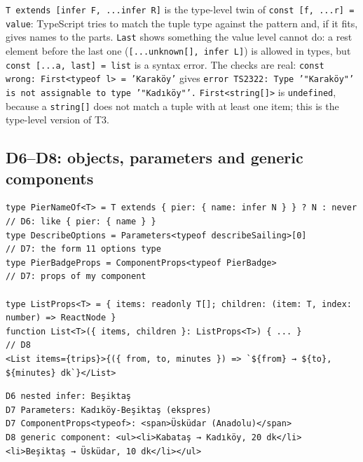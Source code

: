 \documentclass[
  10pt,
]{article}
\begin{document}
\texttt{T extends [\allowbreak{}infer F,\allowbreak{} .\allowbreak{}.\allowbreak{}.\allowbreak{}infer R]}
is the type-level twin of
\texttt{const [\allowbreak{}f,\allowbreak{} .\allowbreak{}.\allowbreak{}.\allowbreak{}r] =\allowbreak{} value}:
TypeScript tries to match the tuple type against the pattern and, if it
fits, gives names to the parts. \texttt{Last} shows something the value
level cannot do: a rest element before the last one
(\texttt{[\allowbreak{}.\allowbreak{}.\allowbreak{}.\allowbreak{}unknown[\allowbreak{}],\allowbreak{} infer L]})
is allowed in types, but
\texttt{const [\allowbreak{}.\allowbreak{}.\allowbreak{}.\allowbreak{}a,\allowbreak{} last] =\allowbreak{} list}
is a syntax error. The checks are real:
\texttt{const wrong:\allowbreak{} First<typeof l> =\allowbreak{} 'Karaköy'}
gives
\texttt{error TS2322:\allowbreak{} Type '"Karaköy"' is not assignable to type '"Kadıköy"'.\allowbreak{}}
\texttt{First<string[\allowbreak{}]>} is \texttt{undefined}, because a
\texttt{string[\allowbreak{}]} does not match a tuple with at least one
item; this is the type-level version of T3.

\hypertarget{d6d8-objects-parameters-and-generic-components}{%
\subsection{D6--D8: objects, parameters and generic
components}\label{d6d8-objects-parameters-and-generic-components}}

\begin{verbatim}
type PierNameOf<T> = T extends { pier: { name: infer N } } ? N : never   // D6: like { pier: { name } }
type DescribeOptions = Parameters<typeof describeSailing>[0]             // D7: the form 11 options type
type PierBadgeProps = ComponentProps<typeof PierBadge>                   // D7: props of my component

type ListProps<T> = { items: readonly T[]; children: (item: T, index: number) => ReactNode }
function List<T>({ items, children }: ListProps<T>) { ... }              // D8
<List items={trips}>{({ from, to, minutes }) => `${from} → ${to}, ${minutes} dk`}</List>
\end{verbatim}

\begin{verbatim}
D6 nested infer: Beşiktaş
D7 Parameters: Kadıköy-Beşiktaş (ekspres)
D7 ComponentProps<typeof>: <span>Üsküdar (Anadolu)</span>
D8 generic component: <ul><li>Kabataş → Kadıköy, 20 dk</li><li>Beşiktaş → Üsküdar, 10 dk</li></ul>
\end{verbatim}
\end{document}
